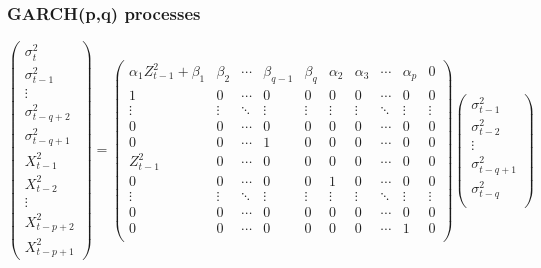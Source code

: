 \documentclass{beamer}
\begin{document}
\begin{frame}
  \frametitle{GARCH(p,q) processes}
  \begin{tiny}
    \begin{equation*}
      \begin{pmatrix}
        \sigma_{t}^2 \\
        \sigma_{t-1}^2 \\
        \vdots \\
        \sigma_{t-q+2}^2 \\
        \sigma_{t-q+1}^2 \\
        X_{t-1}^2 \\
        X_{t-2}^2 \\
        \vdots \\
        X_{t-p+2}^2 \\
        X_{t-p+1}^2
      \end{pmatrix} =
      \begin{pmatrix}
        \alpha_1 Z_{t-1}^2 + \beta_1 & \beta_2 & \cdots &
        \beta_{q-1} & \beta_q & \alpha_2 & \alpha_3 & \cdots & \alpha_p & 0 \\
        1 & 0 & \cdots & 
        0 & 0 & 0 & 0 & \cdots & 0 & 0 \\
        \vdots & \vdots & \ddots & 
        \vdots & \vdots & \vdots & \vdots & \ddots & \vdots & \vdots \\
        0 & 0 & \cdots &
        0 & 0 & 0 & 0 & \cdots & 0 & 0 \\
        0 & 0 & \cdots &
        1 & 0 & 0 & 0 & \cdots & 0 & 0 \\
        Z_{t-1}^2 & 0 & \cdots &
        0 & 0 & 0 & 0 & \cdots & 0 & 0 \\
        0 & 0 & \cdots &
        0 & 0 & 1 & 0 & \cdots & 0 & 0 \\
        \vdots & \vdots & \ddots &
        \vdots & \vdots & \vdots & \vdots & \ddots & \vdots & \vdots \\
        0 & 0 & \cdots &
        0 & 0 & 0 & 0 & \cdots & 0 & 0 \\    
        0 & 0 & \cdots &
        0 & 0 & 0 & 0 & \cdots & 1 & 0 \\    
      \end{pmatrix}
      \begin{pmatrix}
        \sigma_{t-1}^2 \\
        \sigma_{t-2}^2 \\
        \vdots \\
        \sigma_{t-q+1}^2 \\
        \sigma_{t-q}^2 \\

\end{pmatrix}
\end{equation*}
\end{tiny}
\end{frame}
\end{document}
